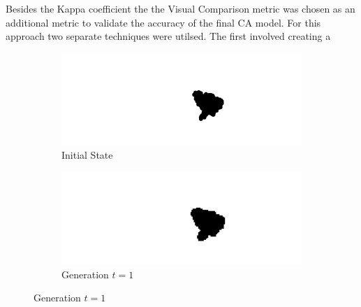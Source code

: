 Besides the Kappa coefficient the the Visual Comparison metric was chosen as an additional metric to validate the accuracy of the final CA model. For this approach two separate techniques were utilsed. The first involved creating a 
\begin{figure}[H]
\begin{subfigure}{.5\textwidth}
  \centering
  \includegraphics[width=1\linewidth]{Figures/Chapter4/generation-0-melusi}
  \caption*{Initial State}
\end{subfigure}
\begin{subfigure}{.5\textwidth}
  \centering
  \includegraphics[width=1\linewidth]{Figures/Chapter4/generation-1-melusi}
  \caption*{Generation $t = 1$}
\end{subfigure}
\end{figure}


